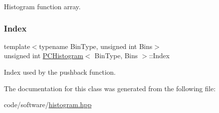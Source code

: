 Histogram function array. 

\mbox{\label{classPCHistogram_a3d0371659763511d752c3348db978f79}} 
\subsubsection{\texorpdfstring{Index}{Index}}
{\footnotesize\ttfamily template$<$typename Bin\+Type, unsigned int Bins$>$ \\
unsigned int \hyperlink{classPCHistogram}{P\+C\+Histogram}$<$ Bin\+Type, Bins $>$\+::Index\hspace{0.3cm}{\ttfamily [private]}}



Index used by the pushback function. 



The documentation for this class was generated from the following file\+:\begin{DoxyCompactItemize}
\item 
code/software/\hyperlink{histogram_8hpp}{histogram.\+hpp}\end{DoxyCompactItemize}
